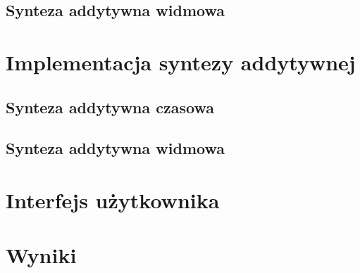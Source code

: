 \subsection{Synteza addytywna widmowa}



\section{Implementacja syntezy addytywnej}

\subsection{Synteza addytywna czasowa}

\subsection{Synteza addytywna widmowa}



\section{Interfejs użytkownika}


\section{Wyniki}